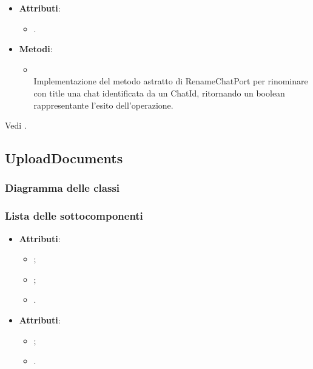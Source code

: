 \documentclass[10pt, a4paper]{article}
\begin{document}
\label{RenameChatPostgresDettaglio}
\begin{itemize}
    \item \textbf{Attributi}:
    \begin{itemize}
        \item {}.
    \end{itemize}
    \item \textbf{Metodi}:
    \begin{itemize}
        \item {}\\
        Implementazione del metodo astratto di RenameChatPort per rinominare con title una chat identificata da un ChatId, ritornando un boolean rappresentante l'esito dell'operazione.
    \end{itemize}
\end{itemize}

Vedi .


\subsection{UploadDocuments}
\subsubsection{Diagramma delle classi}
\subsubsection{Lista delle sottocomponenti}

\label{NewDocumentDettaglio}
\begin{itemize}
    \item \textbf{Attributi}:
    \begin{itemize}
        \item {};
        \item {};
        \item {}.
    \end{itemize}
\end{itemize}

\label{DocumentDettaglio}
\begin{itemize}
    \item \textbf{Attributi}:
    \begin{itemize}
        \item {};
        \item {}.
    \end{itemize}
\end{itemize}
\end{document}
